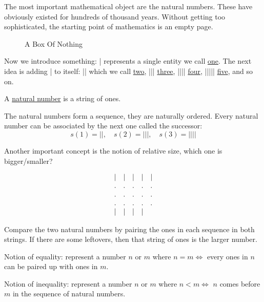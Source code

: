 
The most important mathematical object are the natural numbers. These have obviously existed for hundreds of thousand years. Without getting too sophisticated, the starting point of mathematics is an empty page.

\begin{figure}[ht]
    \centering
    \caption{A Box Of Nothing}
    \label{fig:nothing}
\end{figure}

Now we introduce something:
| represents a single entity we call \underline{one}. The next idea is adding | to itself: || which we call \underline{two}, ||| \underline{three}, |||| \underline{four}, ||||| \underline{five}, and so on.

\begin{definition}
    A \underline{natural number} is a string of ones.
\end{definition}

The natural numbers form a sequence, they are naturally ordered. Every natural number can be associated by the next one called the successor:
\[
    s(1) = ||, \quad s(2) = |||, \quad s(3) = ||||
\]

Another important concept is the notion of relative size, which one is bigger/smaller?

\[
\begin{array}{c c c c c}
| & | & | & | & | \\
. & . & . & . & . \\
. & . & . & . & . \\
. & . & . & . & . \\
| & | & | & | &
\end{array}
\]

Compare the two natural numbers by pairing the ones in each sequence in both strings. If there are some leftovers, then that string of ones is the larger number.

\begin{definition}
    Notion of equality: represent a number \( n \) or \( m \) where \( n = m \iff \) every ones in \( n \) can be paired up with ones in \( m \).
\end{definition}

\begin{definition}
    Notion of inequality: represent a number \( n \) or \( m \) where \( n < m \iff \) \( n \) comes before \( m \) in the sequence of natural numbers.
\end{definition}
